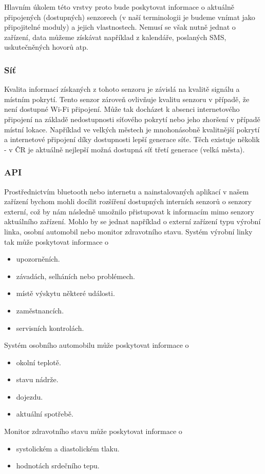 \documentclass[thesis=M,czech]{FITthesis}[2012/06/26]
\begin{document}
Hlavním úkolem této vrstvy proto bude poskytovat informace o aktuálně připojených (dostupných) senzorech (v naší terminologii je budeme vnímat jako připojitelné moduly) a jejich vlastnostech. Nemusí se však nutně jednat o  zařízení, data můžeme získávat například z kalendáře, poslaných SMS, uskutečněných hovorů atp.

\subsubsection*{Síť}
Kvalita informací získaných z tohoto senzoru je závislá na kvalitě signálu a místním pokrytí. Tento senzor zároveň ovlivňuje kvalitu senzoru  v případě, že není dostupné Wi-Fi připojení. Může tak docházet k absenci internetového připojení na základě nedostupnosti síťového pokrytí nebo jeho zhoršení v případě místní lokace. Například ve velkých městech je mnohonásobně kvalitnější pokrytí a internetové připojení díky dostupnosti lepší generace síťe. Těch existuje několik - v ČR je aktuálně nejlepší možná dostupná síť třetí generace (velká města).

\subsubsection*{API}
Prostřednictvím bluetooth nebo internetu a nainstalovaných aplikací v našem zařízení bychom mohli docílit rozšíření dostupných interních senzorů o senzory externí, což by nám následně umožnilo přistupovat k informacím mimo  senzory aktuálního zařízení. Mohlo by se jednat například o externí zařízení typu výrobní linka, osobní automobil nebo monitor zdravotního stavu. Systém výrobní linky tak může poskytovat informace o

\begin{itemize}
\item    upozorněních.
\item    závadách, selháních nebo problémech.
\item    místě výskytu některé události.
\item    zaměstnancích.
\item    servisních kontrolách.
\end{itemize}
Systém osobního automobilu může poskytovat informace o
\begin{itemize}
\item    okolní teplotě.
\item    stavu nádrže.
\item    dojezdu.
\item    aktuální spotřebě.
\end{itemize}
Monitor zdravotního stavu může poskytovat informace o
\begin{itemize}
\item    systolickém a diastolickém tlaku.
\item    hodnotách srdečního tepu.
\end{itemize}
\end{document}

